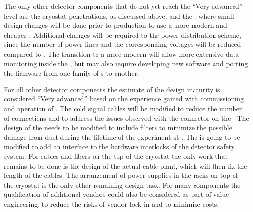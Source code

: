 The only other  detector components that do not yet
reach the ``Very advanced'' level are the cryostat penetrations, as
discussed above, and the , where small
design changes will be done prior to production to use a more
modern and cheaper . Additional changes will be required to
the power distribution scheme, since the number of power lines
and the corresponding voltages will be reduced compared to
. The transition to a more modern  will allow 
more extensive data monitoring inside the , but may
also require developing new software and porting the firmware
from one family of s to another. 

For all other detector components the estimate of the design
maturity is considered ``Very advanced'' based on the experience
gained with commissioning and operation of . The 
cold signal cables will be modified to reduce the number of
connections and to address the issues observed with the connector
on the . The design of the  needs to
be modified to include  filters to minimize the possible
damage from dust during the lifetime of the experiment at .
The  is going to be modified to add an interface to
the hardware interlocks of the detector safety system. For
cables and fibers on the top of the cryostat the only work that
remains to be done is the design of the actual cable plant, 
which will then fix the length of the cables. The arrangement
of power supplies in the racks on top of the cryostat is the
only other remaining design task. For many components the
qualification of additional vendors could also be considered
as part of value engineering, to reduce the risks of vendor
lock-in and to minimize costs. 

